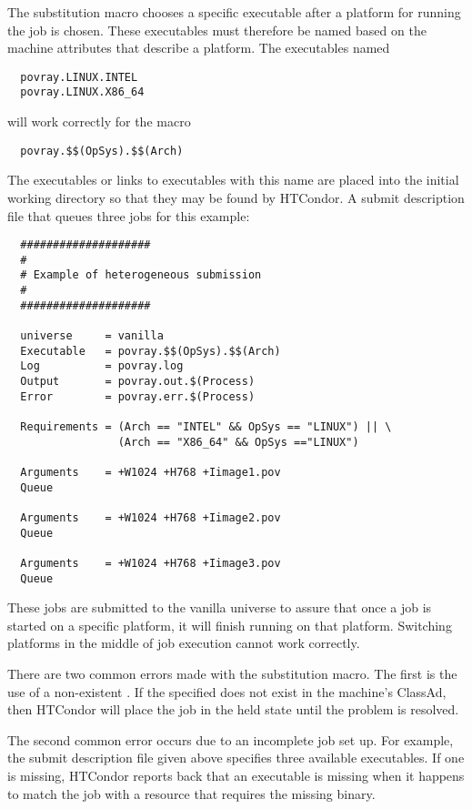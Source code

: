 The substitution macro chooses a specific executable after
a platform for running the job is chosen.
These executables must therefore be named based on the
machine attributes that describe a platform.
The executables named \begin{verbatim}
  povray.LINUX.INTEL
  povray.LINUX.X86_64
\end{verbatim}
will work correctly for the macro
\begin{verbatim}
  povray.$$(OpSys).$$(Arch)
\end{verbatim}

The executables or links to executables with this name
are placed into the initial working directory so that they may be
found by HTCondor. 
A submit description file that queues three jobs for this example:

\begin{verbatim}
  ####################
  #
  # Example of heterogeneous submission
  #
  ####################

  universe     = vanilla
  Executable   = povray.$$(OpSys).$$(Arch)
  Log          = povray.log
  Output       = povray.out.$(Process)
  Error        = povray.err.$(Process)

  Requirements = (Arch == "INTEL" && OpSys == "LINUX") || \
                 (Arch == "X86_64" && OpSys =="LINUX") 

  Arguments    = +W1024 +H768 +Iimage1.pov
  Queue 

  Arguments    = +W1024 +H768 +Iimage2.pov
  Queue 

  Arguments    = +W1024 +H768 +Iimage3.pov
  Queue 
\end{verbatim}

These jobs are submitted to the vanilla universe
to assure that once a job is started on a specific platform,
it will finish running on that platform.
Switching platforms in the middle of job execution cannot
work correctly.

There are two common errors made with the substitution macro.
The first is the use of a non-existent .
If the specified \AdAttr{MachineAdAttribute} does not
exist in the machine's ClassAd, then HTCondor will place
the job in the held state until the problem is resolved.

The second common error occurs due to an incomplete job set up.
For example, the submit description file given above specifies
three available executables.
If one is missing, HTCondor reports back that an
executable is missing when it happens to match the
job with a resource that requires the missing binary.

